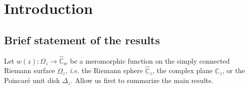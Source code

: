 \documentclass[final,3p,times]{elsarticle}
\newcommand{\CC}{\ensuremath{{\mathbb C}}}
\newcommand{\CW}{\ensuremath{{\widehat{\mathbb C}}}}
\theoremstyle{definition}
\begin{document}



\tableofcontents

\section{Introduction}
\subsection{Brief statement of the results}
Let $w(z):\Omega_z \longrightarrow \CW_w$ be a meromorphic function 
on the simply connected Riemann surface
$\Omega_z$, \emph{i.e.}
the Riemann sphere $\CW_z$,
the complex plane $\CC_z$, 
or the Poincar\'e unit disk $\Delta_z$.
Allow us first to summarize the main results.
\end{document}
